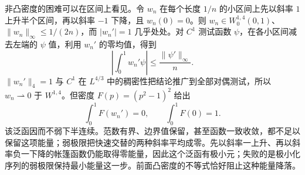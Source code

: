非凸密度的困难可以在区间上看见。令 \(w_n\) 在每个长度 \(1/n\) 的小区间上先以斜率 \(1\) 上升半个区间，再以斜率 \(-1\) 下降，且 \(w_n(0)=0\)。则 \(w_n\in W_0^{1,4}(0,1)\)、\(\|w_n\|_\infty\le1/(2n)\)，而 \(|w_n'|=1\) 几乎处处。对 \(C^1\) 测试函数 \(\psi\)，在各小区间减去左端的 \(\psi\) 值，利用 \(w_n'\) 的零均值，得到
\[\left|\int_0^1w_n'\psi\right|\le\frac{\|\psi'\|_\infty}{n}.\]
\(\|w_n'\|_4=1\) 与 \(C^1\) 在 \(L^{4/3}\) 中的稠密性把结论推广到全部对偶测试，所以 \(w_n\rightharpoonup0\) 于 \(W^{1,4}\)。但密度 \(F(p)=(p^2-1)^2\) 给出
\[\int_0^1F(w_n')=0,\qquad \int_0^1F(0)=1.\]
该泛函因而不弱下半连续。范数有界、边界值保留，甚至函数一致收敛，都不足以保留这项能量；弱极限把快速交替的两种斜率平均成零。先以斜率一上升、再以斜率负一下降的帐篷函数仍能取得零能量，因此这个泛函有极小元；失败的是极小化序列的弱极限保持最小能量这一步。前面凸密度的不等式恰好阻止这种能量降落。
